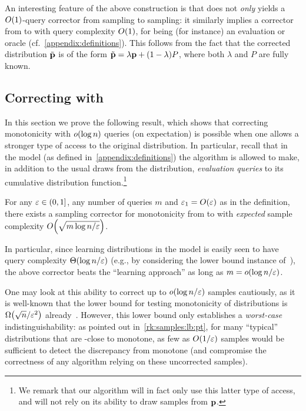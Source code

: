 \begin{remark}\label{rk:oblivious:stronger:queries}
An interesting feature of the above construction is that does not
\emph{only} yields a $\bigO{1}$-query corrector from {sampling to sampling}: it
similarly implies a corrector from \ORACLE to \ORACLE with query complexity
$\bigO{1}$, for \ORACLE being (for instance) an evaluation or \Cdfsamp oracle (cf.~\cref{appendix:definitions}). 
This follows from the fact that the corrected distribution $\tilde{\mathbf{p}}$ is of the form $\tilde{\mathbf{p}} = \lambda\mathbf{p}+(1-\lambda)P$, where
both $\lambda$ and $P$ are fully known.
\end{remark}

\subsection{Correcting with }\label{sec:monotonicity:cdf}
\newcommand{\supb}{S}

In this section we prove the following result, which shows that correcting monotonicity with $\littleO{\log n}$ queries (on expectation) is possible when one allows a stronger type of access to the original distribution. In particular, recall that in the \Cdfsamp model (as defined in~\cref{appendix:definitions}) the algorithm is allowed to make, in addition to the usual draws from the distribution, \emph{evaluation queries} to its cumulative distribution function.\footnote{We remark that our algorithm will in fact only use this latter type of access, and will not rely on its ability to draw samples from $\mathbf{p}$.}

\begin{theorem}\label{theo:samp:corrector:monotonicity:cdf}
For any $\varepsilon \in (0,1]$, any number of queries $m$ and $\eps_1 = \bigO{\eps}$ as in the definition, there exists a sampling corrector for monotonicity from \Cdfsamp to \SAMP with \emph{expected} sample complexity $\bigO{\sqrt{m\log n/\eps}}$.
\end{theorem}
\noindent In particular, since learning distributions in the \Cdfsamp model is easily seen to have query complexity $\bigTheta{\log n/\eps}$ (e.g., by considering the lower bound instance of~\cite{Birge:87}), the above corrector beats the ``learning approach'' as long as $m=\littleO{\log n/\eps}$.

{
\begin{remark}
One may look at this ability to correct up to $\littleO{\log n/\eps}$ samples cautiously, as it is well-known that the lower bound for testing monotonicity of distributions is $\bigOmega{\sqrt{n}/\eps^2}$ already~\cite{BKR:04}. However, this lower bound only establishes a \emph{worst-case} indistinguishability: as pointed out in~\cref{rk:samples:lb:pt}, for many ``typical'' distributions that are \eps-close to monotone, as few as $O(1/\varepsilon)$ samples would be sufficient to detect the discrepancy from monotone (and compromise the correctness of any algorithm relying on these uncorrected samples). 
\end{remark}
}

